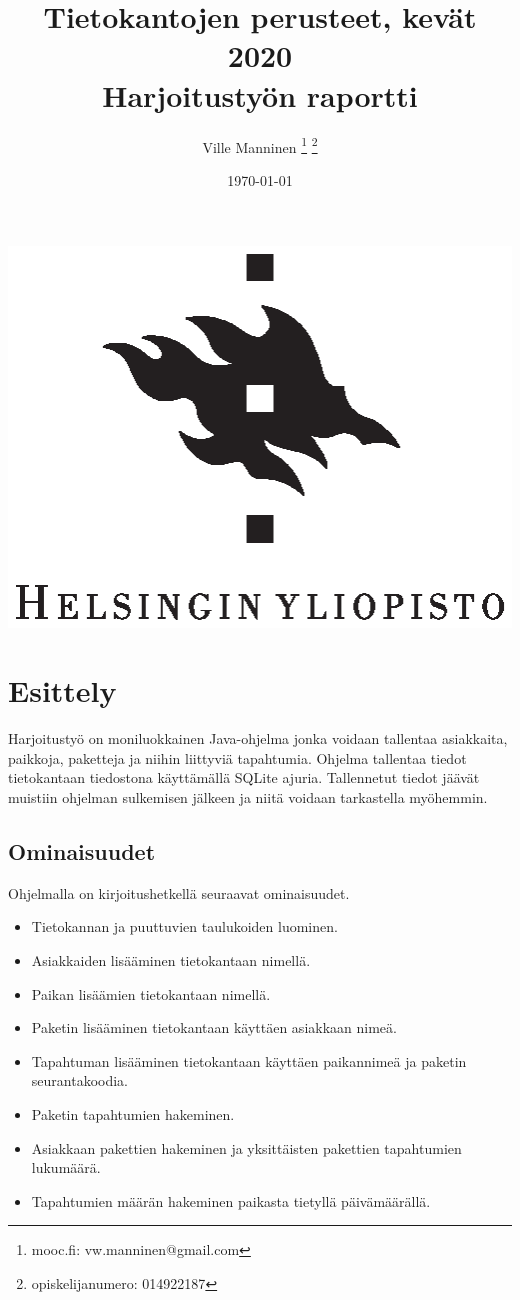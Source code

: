 \documentclass[11pt,a4paper]{article}
\begin{document}
\author{Ville Manninen
\thanks{mooc.fi: vw.manninen@gmail.com}
\thanks{opiskelijanumero: 014922187}}
\date{\today}
\title{Tietokantojen perusteet, kevät 2020 \\
Harjoitustyön raportti}
\maketitle
\begin{center}
\vspace{2cm}
\includegraphics{university-of-helsinki-2.eps} 
\end{center}
\newpage
\tableofcontents
\newpage
\section{Esittely}
Harjoitustyö on moniluokkainen Java-ohjelma jonka voidaan tallentaa asiakkaita, paikkoja, paketteja ja niihin liittyviä tapahtumia. Ohjelma tallentaa tiedot tietokantaan tiedostona käyttämällä SQLite ajuria. Tallennetut tiedot jäävät muistiin ohjelman sulkemisen jälkeen ja niitä voidaan tarkastella myöhemmin.

\subsection*{Ominaisuudet}
Ohjelmalla on kirjoitushetkellä seuraavat ominaisuudet.
\begin{itemize}
\item Tietokannan ja puuttuvien taulukoiden luominen.
\item Asiakkaiden lisääminen tietokantaan nimellä.
\item Paikan lisäämien tietokantaan nimellä.
\item Paketin lisääminen tietokantaan käyttäen asiakkaan nimeä.
\item Tapahtuman lisääminen tietokantaan käyttäen paikannimeä ja paketin seurantakoodia.
\item Paketin tapahtumien hakeminen.
\item Asiakkaan pakettien hakeminen ja yksittäisten pakettien tapahtumien lukumäärä.
\item Tapahtumien määrän hakeminen paikasta tietyllä päivämäärällä.
\end{itemize}
\newpage
\end{document}
